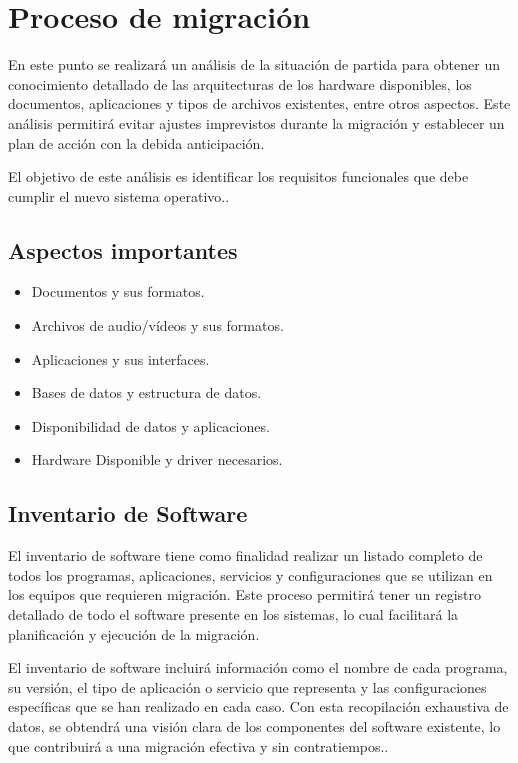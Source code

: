 \chapter{Proceso de migración}\label{ch:migración}

	En este punto se realizará un análisis de la situación de partida para obtener un conocimiento detallado de las arquitecturas de los hardware disponibles, los documentos, aplicaciones y tipos de archivos existentes, entre otros aspectos. Este análisis permitirá evitar ajustes imprevistos durante la migración y establecer un plan de acción con la debida anticipación.

El objetivo de este análisis es identificar los requisitos funcionales que debe cumplir el nuevo sistema operativo..
	
	\section{Aspectos importantes}
	
		\begin{itemize}
			
			\item Documentos y sus formatos.
			\item Archivos de audio/vídeos y sus formatos.
			\item Aplicaciones y sus interfaces.
			\item Bases de datos y estructura de datos.
			\item Disponibilidad de datos y aplicaciones.
			\item Hardware Disponible y driver necesarios.
			
		\end{itemize}
	
		\vspace{0.3cm}
		
	\section{Inventario de Software}
		
		El inventario de software tiene como finalidad realizar un listado completo de todos los programas, aplicaciones, servicios y configuraciones que se utilizan en los equipos que requieren migración. Este proceso permitirá tener un registro detallado de todo el software presente en los sistemas, lo cual facilitará la planificación y ejecución de la migración.\par

El inventario de software incluirá información como el nombre de cada programa, su versión, el tipo de aplicación o servicio que representa y las configuraciones específicas que se han realizado en cada caso. Con esta recopilación exhaustiva de datos, se obtendrá una visión clara de los componentes del software existente, lo que contribuirá a una migración efectiva y sin contratiempos..\par
		
